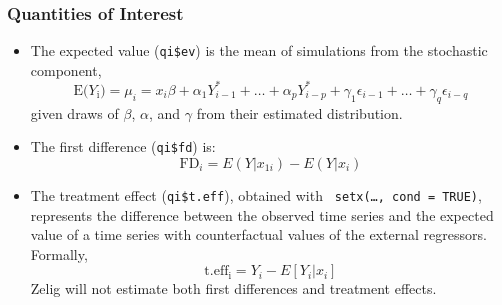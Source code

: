 \subsubsection*{Quantities of Interest}
\begin{itemize}
\item The expected value ({\tt qi\$ev}) is the mean of simulations
  from the stochastic component, 
\begin{equation*}
\text{E(}Y_\text{i}) = \mu_i = x_i \beta + \alpha_1 Y_{i-1}^* + \hdots + \alpha_p Y_{i-p}^*
+ \gamma_1\epsilon_{i-1} + \hdots + \gamma_q \epsilon_{i-q}
\end{equation*}
given draws of $\beta$, $\alpha$, and $\gamma$ from their estimated
distribution.
\item The first difference ({\tt qi\$fd}) is: 
\begin{equation*}
\text{FD}_i= E(Y | x_{1i}) - E(Y|x_{i})  
\end{equation*}
\item The treatment effect ({\tt qi\$t.eff}), obtained with {\tt
setx(\dots, cond = TRUE)}, represents the difference
between the observed time series and the expected value of a time
series with counterfactual values of the external regressors.  Formally,
\begin{equation*}
\text{t.eff}_\text{i} = Y_i - E[Y_i | x_{i}] 
\end{equation*}
Zelig will not estimate both first differences and treatment effects.
\end{itemize}


